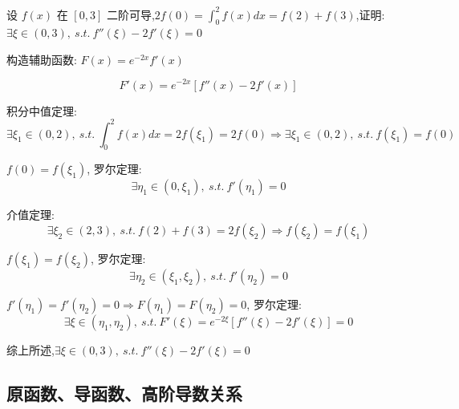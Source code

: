 \begin{proposition}
	设 $f(x)$ 在 $[0,3]$ 二阶可导,$2f(0)=\int_{0}^{2}f(x)dx=f(2)+f(3)$,证明: $\exists \xi\in(0,3),\ s.t.\ f''(\xi)-2f'(\xi)=0$
\end{proposition}
\begin{solution}

	构造辅助函数: $F(x)=e^{-2x}f'(x)$

	$$F'(x)=e^{-2x}[f''(x)-2f'(x)]$$

	积分中值定理:
	$$\exists \xi_{1}\in(0,2),\ s.t.\ \int_{0}^{2}f(x)dx=2f(\xi_{1})=2f(0)\Rightarrow \exists \xi_{1}\in(0,2),\ s.t.\ f(\xi_{1}) = f(0)$$

	$f(0) = f(\xi_{1})$, 罗尔定理:
	$$\exists \eta_{1}\in(0,\xi_{1}),\ s.t.\ f'(\eta_{1})=0$$

	介值定理: 
	$$\exists \xi_{2}\in(2,3),\ s.t.\ f(2)+f(3)=2f(\xi_{2})\Rightarrow f(\xi_{2})=f(\xi_{1})$$

	$f(\xi_{1}) = f(\xi_{2})$, 罗尔定理:
	$$\exists \eta_{2}\in(\xi_{1},\xi_{2}),\ s.t.\ f'(\eta_{2})=0$$

	$f'(\eta_{1}) = f'(\eta_{2}) = 0\Rightarrow F(\eta_{1}) = F(\eta_{2}) =0$, 罗尔定理:
	$$\exists \xi\in(\eta_{1},\eta_{2}),\ s.t.\ F'(\xi)=e^{-2\xi}[f''(\xi)-2f'(\xi)]=0$$

	综上所述,$\exists \xi\in(0,3),\ s.t.\ f''(\xi)-2f'(\xi)=0$
\end{solution}

\subsection{原函数、导函数、高阶导数关系}

